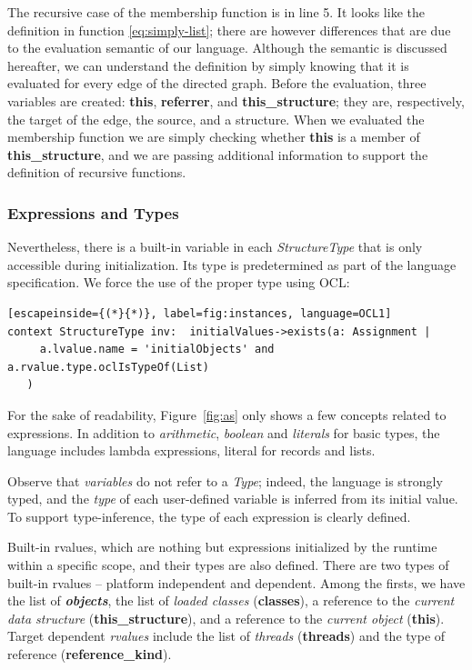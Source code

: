 The recursive case of the membership function is in line 5.
It looks like the definition in function \ref{eq:simply-list}; there are however differences that are due to the evaluation semantic of our language.
Although the semantic is discussed hereafter, we can understand the definition by simply knowing that it is evaluated for every edge of the directed graph.
Before the evaluation, three variables are created: \textbf{this}, \textbf{referrer}, and \textbf{this\_structure}; they are, respectively, the target of the edge, the source, and a structure.
When we evaluated the membership function we are simply checking whether \textbf{this} is a member of \textbf{this\_structure}, and we are passing additional information to support the definition of recursive functions.



\subsubsection*{Expressions and Types}


Nevertheless, there is a built-in variable in each \textit{StructureType} that is only accessible during initialization.
Its type is predetermined as part of the language specification.
We force the use of the proper type using OCL:

\begin{lstlisting}[escapeinside={(*}{*)}, label=fig:instances, language=OCL1]
context StructureType inv:  initialValues->exists(a: Assignment | 
     a.lvalue.name = 'initialObjects' and a.rvalue.type.oclIsTypeOf(List)
   ) 
\end{lstlisting}


For the sake of readability, Figure~\ref{fig:as} only shows a few concepts related to expressions.
In addition to \textit{arithmetic}, \textit{boolean} and \textit{literals} for basic types, the language includes lambda expressions, literal for records and lists.

Observe that \textit{variables} do not refer to a \textit{Type}; indeed, the language is  strongly typed, and the \textit{type} of each user-defined variable is inferred from its initial value.
To support type-inference, the type of each expression is clearly defined.

Built-in rvalues, which are nothing but expressions initialized by the runtime within a specific scope, and their types are also defined.
There are two types of built-in rvalues -- platform independent and dependent.
Among the firsts, we have the list of  \textit{\textbf{objects}}, the list of \textit{loaded classes} (\textbf{classes}), a reference to the \textit{current data structure} (\textbf{this\_structure}), and a reference to the \textit{current object} (\textbf{this}).
Target dependent \textit{rvalues} include the list of \textit{threads} (\textbf{threads}) and the type of reference (\textbf{reference\_kind}).

